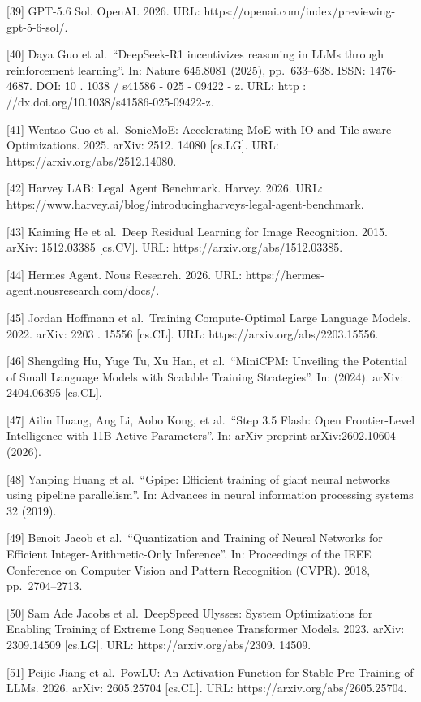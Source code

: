 \documentclass[
  10
]{article}
\begin{document}
{[}39{]} GPT-5.6 Sol. OpenAI. 2026. URL:
https://openai.com/index/previewing-gpt-5-6-sol/.

{[}40{]} Daya Guo et al.~``DeepSeek-R1 incentivizes reasoning in LLMs
through reinforcement learning''. In: Nature 645.8081 (2025),
pp.~633--638. ISSN: 1476-4687. DOI: 10 . 1038 / s41586 - 025 - 09422 -
z. URL: http : //dx.doi.org/10.1038/s41586-025-09422-z.

{[}41{]} Wentao Guo et al.~SonicMoE: Accelerating MoE with IO and
Tile-aware Optimizations. 2025. arXiv: 2512. 14080 {[}cs.LG{]}. URL:
https://arxiv.org/abs/2512.14080.

{[}42{]} Harvey LAB: Legal Agent Benchmark. Harvey. 2026. URL:
https://www.harvey.ai/blog/introducingharveys-legal-agent-benchmark.

{[}43{]} Kaiming He et al.~Deep Residual Learning for Image Recognition.
2015. arXiv: 1512.03385 {[}cs.CV{]}. URL:
https://arxiv.org/abs/1512.03385.

{[}44{]} Hermes Agent. Nous Research. 2026. URL:
https://hermes-agent.nousresearch.com/docs/.

{[}45{]} Jordan Hoffmann et al.~Training Compute-Optimal Large Language
Models. 2022. arXiv: 2203 . 15556 {[}cs.CL{]}. URL:
https://arxiv.org/abs/2203.15556.

{[}46{]} Shengding Hu, Yuge Tu, Xu Han, et al.~``MiniCPM: Unveiling the
Potential of Small Language Models with Scalable Training Strategies''.
In: (2024). arXiv: 2404.06395 {[}cs.CL{]}.

{[}47{]} Ailin Huang, Ang Li, Aobo Kong, et al.~``Step 3.5 Flash: Open
Frontier-Level Intelligence with 11B Active Parameters''. In: arXiv
preprint arXiv:2602.10604 (2026).

{[}48{]} Yanping Huang et al.~``Gpipe: Efficient training of giant
neural networks using pipeline parallelism''. In: Advances in neural
information processing systems 32 (2019).

{[}49{]} Benoit Jacob et al.~``Quantization and Training of Neural
Networks for Efficient Integer-Arithmetic-Only Inference''. In:
Proceedings of the IEEE Conference on Computer Vision and Pattern
Recognition (CVPR). 2018, pp.~2704--2713.

{[}50{]} Sam Ade Jacobs et al.~DeepSpeed Ulysses: System Optimizations
for Enabling Training of Extreme Long Sequence Transformer Models. 2023.
arXiv: 2309.14509 {[}cs.LG{]}. URL: https://arxiv.org/abs/2309. 14509.

{[}51{]} Peijie Jiang et al.~PowLU: An Activation Function for Stable
Pre-Training of LLMs. 2026. arXiv: 2605.25704 {[}cs.CL{]}. URL:
https://arxiv.org/abs/2605.25704.
\end{document}
